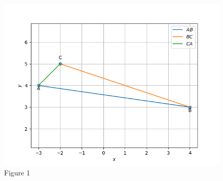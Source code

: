 \documentclass[journal,12pt,twocolumn]{IEEEtran}
\theoremstyle{remark}
\begin{document}
\begin{figure}[h!]
\centering

\includegraphics[width=\columnwidth] {./figs/fig17.png}
\caption{Figure 1}
\label{fig1: sides}
\end{figure}
\end{document}
